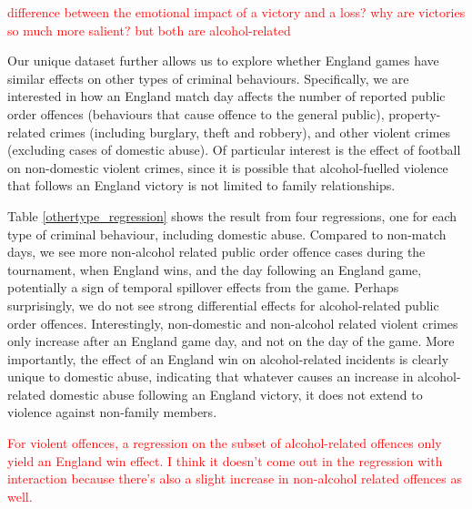 \documentclass[12pt, letterpaper]{article}
\begin{document}
\textcolor{red}{difference between the emotional impact of a victory and a loss? why are victories so much more salient? but both are alcohol-related}

Our unique dataset further allows us to explore whether England games have similar effects on other types of criminal behaviours. Specifically, we are interested in how an England match day affects the number of reported public order offences (behaviours that cause offence to the general public), property-related crimes (including burglary, theft and robbery), and other violent crimes (excluding cases of domestic abuse).  Of particular interest is the effect of football on non-domestic violent crimes, since it is possible that alcohol-fuelled violence that follows an England victory is not limited to family relationships.

Table \ref{othertype_regression} shows the result from four regressions, one for each type of criminal behaviour, including domestic abuse. Compared to non-match days, we see more non-alcohol related public order offence cases during the tournament, when England wins, and the day following an England game, potentially a sign of temporal spillover effects from the game. Perhaps surprisingly, we do not see strong differential effects for alcohol-related public order offences. Interestingly, non-domestic and non-alcohol related violent crimes only increase after an England game day, and not on the day of the game. More importantly, the effect of an England win on alcohol-related incidents is clearly unique to domestic abuse, indicating that whatever causes an increase in alcohol-related domestic abuse following an England victory, it does not extend to violence against non-family members. 

\textcolor{red}{For violent offences, a regression on the subset of alcohol-related offences only yield an England win effect. I think it doesn't come out in the regression with interaction because there's also a slight increase in non-alcohol related offences as well.}
\end{document}
